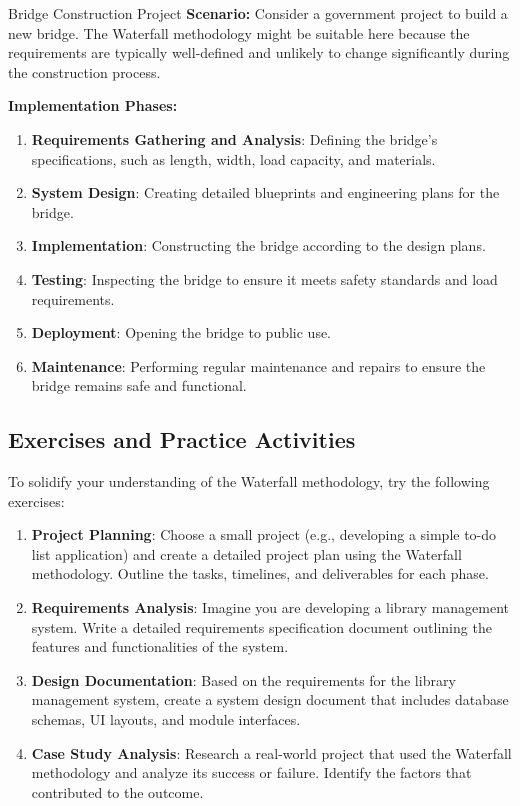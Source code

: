 \begin{examplebox}{Bridge Construction Project}
  \textbf{Scenario:} Consider a government project to build a new bridge. The Waterfall methodology might be suitable here because the requirements are typically well-defined and unlikely to change significantly during the construction process.

  \textbf{Implementation Phases:}

  \begin{enumerate}
    \item \textbf{Requirements Gathering and Analysis}: Defining the bridge's specifications, such as length, width, load capacity, and materials.
    \item \textbf{System Design}: Creating detailed blueprints and engineering plans for the bridge.
    \item \textbf{Implementation}: Constructing the bridge according to the design plans.
    \item \textbf{Testing}: Inspecting the bridge to ensure it meets safety standards and load requirements.
    \item \textbf{Deployment}: Opening the bridge to public use.
    \item \textbf{Maintenance}: Performing regular maintenance and repairs to ensure the bridge remains safe and functional.
  \end{enumerate}
\end{examplebox}

\subsection{Exercises and Practice Activities}

To solidify your understanding of the Waterfall methodology, try the following
exercises:

\begin{enumerate}
  \item \textbf{Project Planning}: Choose a small project (e.g., developing a simple to-do list application) and create a detailed project plan using the Waterfall methodology. Outline the tasks, timelines, and deliverables for each phase.
  \item \textbf{Requirements Analysis}: Imagine you are developing a library management system. Write a detailed requirements specification document outlining the features and functionalities of the system.
  \item \textbf{Design Documentation}: Based on the requirements for the library management system, create a system design document that includes database schemas, UI layouts, and module interfaces.
  \item \textbf{Case Study Analysis}: Research a real-world project that used the Waterfall methodology and analyze its success or failure. Identify the factors that contributed to the outcome.
\end{enumerate}

